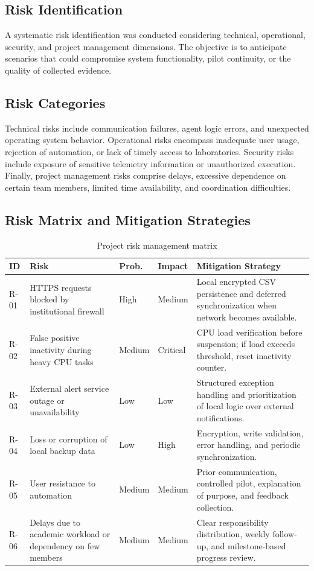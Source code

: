 \documentclass[12pt,a4paper]{article}
\begin{document}
\subsection{Risk Identification}
A systematic risk identification was conducted considering technical, operational, security, and project management dimensions. The objective is to anticipate scenarios that could compromise system functionality, pilot continuity, or the quality of collected evidence.

\subsection{Risk Categories}
Technical risks include communication failures, agent logic errors, and unexpected operating system behavior. Operational risks encompass inadequate user usage, rejection of automation, or lack of timely access to laboratories. Security risks include exposure of sensitive telemetry information or unauthorized execution. Finally, project management risks comprise delays, excessive dependence on certain team members, limited time availability, and coordination difficulties.

\subsection{Risk Matrix and Mitigation Strategies}
\begin{table}[H]
\caption{Project risk management matrix}
\label{tab:risks}
\centering
\begin{tabular}{|p{0.9cm}|p{4.2cm}|p{1.8cm}|p{1.8cm}|p{5.5cm}|}
\hline
\textbf{ID} & \textbf{Risk} & \textbf{Prob.} & \textbf{Impact} & \textbf{Mitigation Strategy} \\
\hline
R-01 & HTTPS requests blocked by institutional firewall & High & Medium & Local encrypted CSV persistence and deferred synchronization when network becomes available. \\
\hline
R-02 & False positive inactivity during heavy CPU tasks & Medium & Critical & CPU load verification before suspension; if load exceeds threshold, reset inactivity counter. \\
\hline
R-03 & External alert service outage or unavailability & Low & Low & Structured exception handling and prioritization of local logic over external notifications. \\
\hline
R-04 & Loss or corruption of local backup data & Low & High & Encryption, write validation, error handling, and periodic synchronization. \\
\hline
R-05 & User resistance to automation & Medium & Medium & Prior communication, controlled pilot, explanation of purpose, and feedback collection. \\
\hline
R-06 & Delays due to academic workload or dependency on few members & Medium & Medium & Clear responsibility distribution, weekly follow-up, and milestone-based progress review. \\
\hline
\end{tabular}
\end{table}
\end{document}
